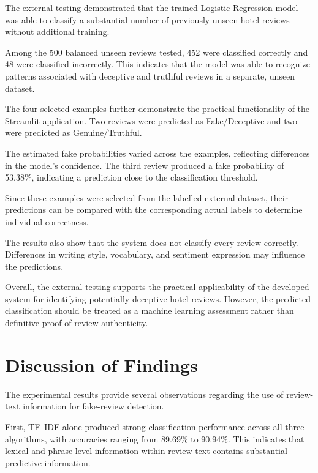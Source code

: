 \documentclass[12pt,a4paper]{report}
\begin{document}
The external testing demonstrated that the
trained Logistic Regression model was able to
classify a substantial number of previously
unseen hotel reviews without additional training.

Among the 500 balanced unseen reviews tested,
452 were classified correctly and 48 were
classified incorrectly. This indicates that
the model was able to recognize patterns
associated with deceptive and truthful reviews
in a separate, unseen dataset.

The four selected examples further demonstrate
the practical functionality of the Streamlit
application. Two reviews were predicted as
Fake/Deceptive and two were predicted as
Genuine/Truthful.

The estimated fake probabilities varied across
the examples, reflecting differences in the
model's confidence. The third review produced
a fake probability of 53.38\%, indicating
a prediction close to the classification
threshold.

Since these examples were selected from the
labelled external dataset, their predictions
can be compared with the corresponding actual
labels to determine individual correctness.

The results also show that the system does not
classify every review correctly. Differences
in writing style, vocabulary, and sentiment
expression may influence the predictions.

Overall, the external testing supports the
practical applicability of the developed
system for identifying potentially deceptive
hotel reviews. However, the predicted
classification should be treated as a
machine learning assessment rather than
definitive proof of review authenticity.


\section{Discussion of Findings}

The experimental results provide several observations regarding the
use of review-text information for fake-review detection.

First, TF--IDF alone produced strong classification performance across
all three algorithms, with accuracies ranging from 89.69\% to 90.94\%.
This indicates that lexical and phrase-level information within review
text contains substantial predictive information.
\end{document}
